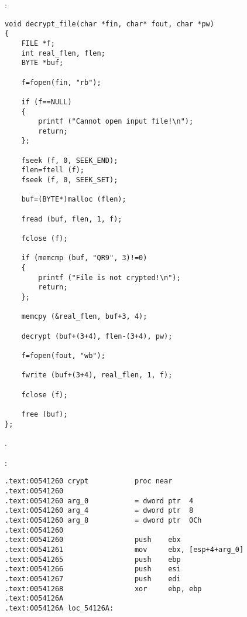 :

\begin{lstlisting}
void decrypt_file(char *fin, char* fout, char *pw)
{
	FILE *f;
	int real_flen, flen;
	BYTE *buf;

	f=fopen(fin, "rb");
	
	if (f==NULL)
	{
		printf ("Cannot open input file!\n");
		return;
	};

	fseek (f, 0, SEEK_END);
	flen=ftell (f);
	fseek (f, 0, SEEK_SET);

	buf=(BYTE*)malloc (flen);

	fread (buf, flen, 1, f);

	fclose (f);

	if (memcmp (buf, "QR9", 3)!=0)
	{
		printf ("File is not crypted!\n");
		return;
	};

	memcpy (&real_flen, buf+3, 4);

	decrypt (buf+(3+4), flen-(3+4), pw);
	
	f=fopen(fout, "wb");

	fwrite (buf+(3+4), real_flen, 1, f);

	fclose (f);

	free (buf);
};
\end{lstlisting}

.

 :

\begin{lstlisting}
.text:00541260 crypt           proc near
.text:00541260
.text:00541260 arg_0           = dword ptr  4
.text:00541260 arg_4           = dword ptr  8
.text:00541260 arg_8           = dword ptr  0Ch
.text:00541260
.text:00541260                 push    ebx
.text:00541261                 mov     ebx, [esp+4+arg_0]
.text:00541265                 push    ebp
.text:00541266                 push    esi
.text:00541267                 push    edi
.text:00541268                 xor     ebp, ebp
.text:0054126A
.text:0054126A loc_54126A:
\end{lstlisting}


